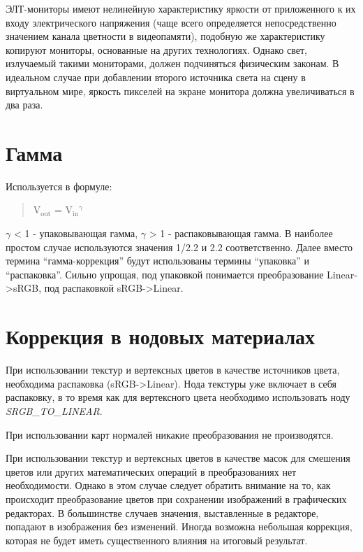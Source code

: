 \documentclass[a4paper,12pt,oneside]{sphinxmanual}
\begin{document}
ЭЛТ-мониторы имеют нелинейную характеристику яркости от приложенного к их входу
электрического напряжения (чаще всего определяется непосредственно значением
канала цветности в видеопамяти), подобную же характеристику копируют мониторы,
основанные на других технологиях. Однако свет, излучаемый такими мониторами,
должен подчиняться физическим законам. В идеальном случае при добавлении второго
источника света на сцену в виртуальном мире, яркость пикселей на экране монитора
должна увеличиваться в два раза.


\section{Гамма}
\label{gamma_alpha:id4}
Используется в формуле:
\begin{quote}

V$_{\text{out}}$ = V$_{\text{in}}$$^{\text{\(\gamma\)}}$
\end{quote}

\(\gamma\) \textless{} 1 - упаковывающая гамма, \(\gamma\) \textgreater{} 1 - распаковывающая гамма. В наиболее простом
случае используются значения 1/2.2 и 2.2 соответственно. Далее вместо термина
``гамма-коррекция'' будут использованы термины ``упаковка'' и ``распаковка''. Сильно
упрощая, под упаковкой понимается преобразование Linear-\textgreater{}sRGB, под распаковкой
sRGB-\textgreater{}Linear.


\section{Коррекция в нодовых материалах}
\label{gamma_alpha:gamma-nodes}\label{gamma_alpha:id5}
При использовании текстур и вертексных цветов в качестве источников цвета,
необходима распаковка (sRGB-\textgreater{}Linear). Нода текстуры уже включает в себя
распаковку, в то время как для вертексного цвета необходимо использовать ноду
\emph{SRGB\_TO\_LINEAR}.

При использовании карт нормалей никакие преобразования не производятся.

При использовании текстур и вертексных цветов в качестве масок для смешения
цветов или других математических операций в преобразованиях нет необходимости.
Однако в этом случае следует обратить внимание на то, как происходит
преобразование цветов при сохранении изображений в графических редакторах. В
большинстве случаев значения, выставленные в редакторе, попадают в изображения без
изменений. Иногда возможна небольшая коррекция, которая не будет
иметь существенного влияния на итоговый результат.
\end{document}
